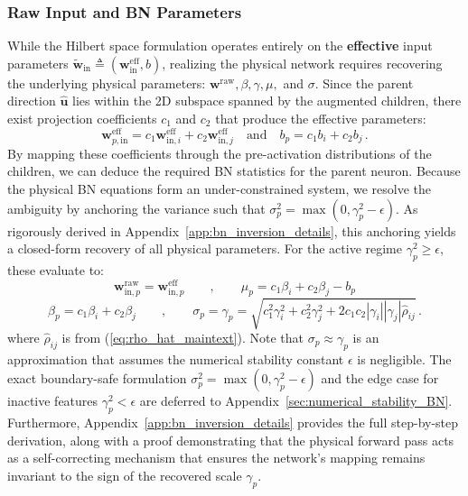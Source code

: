 \documentclass[11pt, a4paper, copyright, gdm]{google}
\newcommand{\uVect}{\boldsymbol{u}}
\newcommand{\wVect}{\boldsymbol{w}}
\theoremstyle{definition}
\begin{document}
\subsubsection{Raw Input and BN Parameters}
\label{sec:bn_invert}
While the Hilbert space formulation operates entirely on the \textbf{effective} input parameters $\tilde{\wVect}_{\text{in}} \triangleq (\wVect_{\text{in}}^{\text{eff}}, b)$, realizing the physical network requires recovering the underlying physical parameters: $\wVect^\text{raw}, \beta, \gamma, \mu,$ and $\sigma$. Since the parent direction $\widehat{\uVect}$ lies within the 2D subspace spanned by the augmented children, there exist projection coefficients $c_1$ and $c_2$ that produce the effective parameters:
\begin{equation}
\wVect_{p, \text{in}}^{\text{eff}} = c_1 \wVect_{\text{in},i}^{\text{eff}} + c_2 \wVect_{\text{in},j}^{\text{eff}} \quad \text{and} \quad b_p = c_1 b_i + c_2 b_j \,.
\end{equation}
By mapping these coefficients through the pre-activation distributions of the children, we can deduce the required BN statistics for the parent neuron. Because the physical BN equations form an under-constrained system, we resolve the ambiguity by anchoring the variance such that $\sigma_p^2 = \max(0, \gamma_p^2 - \epsilon)$. As rigorously derived in Appendix~\ref{app:bn_inversion_details}, this anchoring yields a closed-form recovery of all physical parameters. For the active regime $\gamma_p^2 \ge \epsilon$, these evaluate to:
\begin{equation}
\wVect_{\text{in},p}^{\text{raw}} =  \wVect_{\text{in},p}^{\text{eff}} \qquad , \qquad \mu_p = c_1 \beta_i + c_2 \beta_j - b_p
\end{equation}
\begin{equation}
\beta_p = c_1 \beta_i + c_2 \beta_j \qquad,\qquad \sigma_p = \gamma_p = \sqrt{c_1^2 \gamma_i^2 + c_2^2 \gamma_j^2 + 2 c_1 c_2 |\gamma_i| |\gamma_j| \hat{\rho}_{ij}} \,.
\end{equation}
where $\hat{\rho}_{ij}$ is from (\ref{eq:rho_hat_maintext}). Note that $\sigma_p \approx \gamma_p$ is an approximation that assumes the numerical stability constant $\epsilon$ is negligible. The exact boundary-safe formulation $\sigma_p^2 = \max(0, \gamma_p^2 - \epsilon)$ and the edge case for inactive features $\gamma_p^2 < \epsilon$ are deferred to Appendix~\ref{sec:numerical_stability_BN}. Furthermore, Appendix~\ref{app:bn_inversion_details} provides the full step-by-step derivation, along with a proof demonstrating that the physical forward pass acts as a self-correcting mechanism that ensures the network's mapping remains invariant to the sign of the recovered scale $\gamma_p$.
\end{document}
